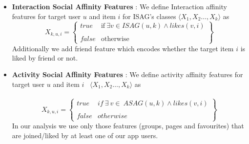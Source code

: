 \begin{itemize}
  \item \textbf{Interaction Social Affinity Features} : We define Interaction affinity features for target user $u$ and item $i$ for ISAG's classes 
  $ \langle X_{1},X_{2}\ldots,X_{k}\rangle$ as
  \begin{equation*}
   X_{k,u,i} = \begin{Bmatrix}
   		\mathit{true} & \text{if}\ \exists v\in ISAG(u,k) \wedge likes(v,i)\\ \\
   		\mathit{false} & \text{otherwise}
   \end{Bmatrix}
  \end{equation*}
  Additionally we add friend feature which encodes whether the target item $i$ is liked by friend or not.
  \item \textbf{Activity Social Affinity Features} : We define activity affinity features for target user $u$ and item $i$   \
  $ \langle X_{1},X_{2}\ldots,X_{k}\rangle$ as\\ \\
  \begin{equation*}
   X_{k,u,i} = \begin{Bmatrix}
   		\mathit{true} & if\ \exists\ v\in \ ASAG(u,k) \wedge likes(v,i)\\ \\
   		\mathit{false} & otherwise
   \end{Bmatrix}
  \end{equation*}
	In our analysis we use only those features (groups, pages and favourites) that are joined/liked by at least one of our app users.
\end{itemize}

